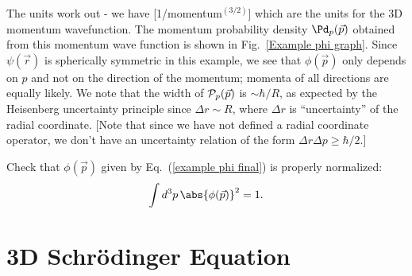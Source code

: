 \begin{example}
\assess The units work out - we have [1/momentum$^{(3/2)}$] which are the units for the 3D momentum wavefunction. The momentum probability density $\Pd_{p}(\vec{p})$ obtained from this momentum wave function is shown in Fig.~\ref{Example phi graph}.   Since $\psi(\vec{r})$ is spherically symmetric in this example, we see that $\phi(\vec{p})$ only depends on $p$ and not on the direction of the momentum; momenta of all directions are equally likely.  We note that the width of ${\cal P}_{p}(\vec{p})$ is $\sim \hbar/R$, as expected by the Heisenberg uncertainty principle since $\Delta r \sim R$, where $\Delta r$ is ``uncertainty'' of the radial coordinate.  [Note that since we have not defined a radial coordinate operator, we don't have an uncertainty relation of the form $\Delta r\Delta p \geq \hbar/2$.]

\end{example}

\begin{exercise}
Check that $\phi(\vec{p})$ given by Eq.~(\ref{example phi final}) is properly normalized:
%
\begin{equation}
\int d^{3}p\, \abs{\phi(\vec{p})}^{2} = 1.
\end{equation}

\end{exercise}

\section{3D Schr\"{o}dinger Equation}

